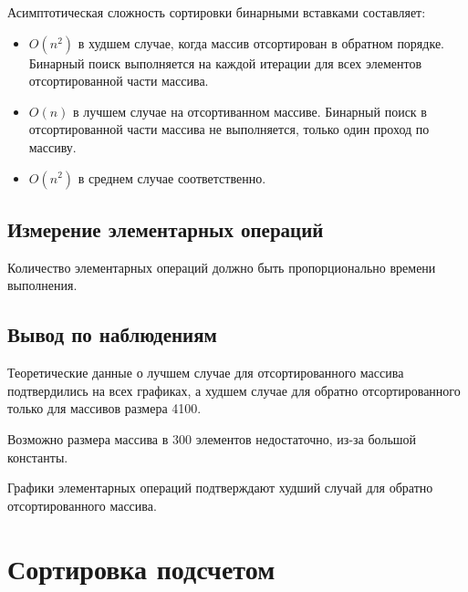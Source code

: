 \documentclass[11pt]{article}
\begin{document}
Асимптотическая сложность сортировки бинарными вставками составляет:
\begin{itemize}
    \item $O(n^2)$ в худшем случае, когда массив отсортирован в обратном порядке. Бинарный поиск выполняется на каждой
          итерации для всех элементов отсортированной части массива.
    \item $O(n)$ в лучшем случае на отсортиванном массиве. Бинарный поиск в отсортированной части массива не выполняется, только один проход по массиву.
    \item $O(n^2)$ в среднем случае соответственно.
\end{itemize}

\subsection{Измерение элементарных операций}

\begin{center}
\end{center}
{ \hspace*{\fill} }

\begin{center}
\end{center}
{ \hspace*{\fill} }

Количество элементарных операций должно быть пропорционально времени выполнения.

\subsection{Вывод по наблюдениям}

Теоретические данные о лучшем случае для отсортированного массива подтвердились на
всех графиках, а худшем случае для обратно отсортированного только для массивов размера 4100.

Возможно размера массива в 300 элементов недостаточно, из-за большой константы.

Графики элементарных операций подтверждают худший случай для обратно отсортированного массива.

\newpage

\setcounter{section}{7}
\section*{\centering Сортировка подсчетом}
\end{document}
